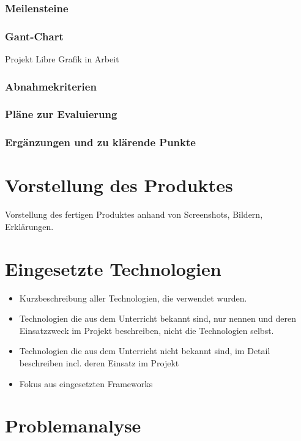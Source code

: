 \subsection{Meilensteine}




\subsection{Gant-Chart}

Projekt Libre Grafik in Arbeit
\subsection{Abnahmekriterien}
\subsection{Pläne zur Evaluierung}
\subsection{Ergänzungen und zu klärende Punkte}

\chapter{Vorstellung des Produktes}
Vorstellung des fertigen Produktes anhand von Screenshots, Bildern, Erklärungen.

\chapter{Eingesetzte Technologien}
\begin{itemize}
	\item Kurzbeschreibung aller Technologien, die verwendet wurden.
	\item Technologien die aus dem Unterricht bekannt sind, nur nennen und deren  Einsatzzweck im Projekt beschreiben, nicht die Technologien selbst.
	\item Technologien die aus dem Unterricht nicht bekannt sind, im Detail beschreiben incl. deren Einsatz im Projekt
	\item Fokus aus eingesetzten Frameworks
\end{itemize}

\chapter{Problemanalyse}
